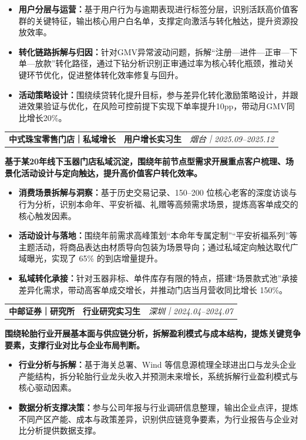 \documentclass[10pt, a4paper]{article}
\makeatletter
\newcommand{\resumeEntry}[4]{
  \vspace{3.5pt}
  \noindent
  {\normalsize
  \begin{tabular*}{\textwidth}{@{}p{0.33\textwidth}@{\extracolsep{\fill}}>{\centering\arraybackslash}p{0.34\textwidth}>{\raggedleft\arraybackslash}p{0.33\textwidth}@{}}
    \textbf{#1} & \textbf{#3} & {\small\textit{#2｜#4}}
  \end{tabular*}\par}
  \vspace{1pt}
}
\newcommand{\resumeDesc}[1]{
  \vspace{-1pt}
  {\footnotesize\noindent\textbf{#1}\par}
  \vspace{2pt}
}
\makeatother
\begin{document}
\begin{itemize}
    \item \textbf{用户分层与运营：}基于用户行为与逾期表现进行标签分层，识别活跃高价值客群的关键特征，输出核心用户白名单，支撑定向激活与转化触达，提升资源投放效率。
    \item \textbf{转化链路拆解与归因：}针对GMV异常波动问题，拆解“注册—进件—正审—下单—放款”转化路径，通过下钻分析识别正审通过率为核心转化瓶颈，推动关键环节优化，促进整体转化效率修复与回升。
    \item \textbf{活动策略设计：}围绕续贷转化提升目标，参与差异化转化激励策略设计，并跟进效果验证与优化，在风险可控前提下实现下单率提升10pp，带动月GMV同比增长20\%。
\end{itemize}

\resumeEntry{中式珠宝零售门店｜私域增长}{烟台}{用户增长实习生}{2025.09--2025.12}
\resumeDesc{基于某20年线下玉器门店私域沉淀，围绕年前节点型需求开展重点客户梳理、场景化活动设计与定向触达，提升高价值客户转化效率。}

\begin{itemize}
    \item \textbf{消费场景拆解与洞察：}基于历史交易记录、150--200 位核心老客的深度访谈与行为分析，识别本命年、平安祈福、礼赠等高频需求场景，提炼高客单成交的核心触发因素。
    \item \textbf{活动设计与落地：}围绕年前需求高峰策划“本命年专属定制”“平安祈福系列”等主题活动，将商品表达由材质导向包装为场景导向；通过私域定向触达取代广域曝光，实现了 65\% 的到店增量提升。
    \item \textbf{私域转化承接：}针对玉器非标、单件库存有限的特点，搭建“场景款式池”承接差异化需求，带动高客单成交增长，并推动门店当月营收同比增长 150\%。
\end{itemize}

\resumeEntry{中邮证券｜研究所}{深圳}{行业研究实习生}{2024.04--2024.07}
\resumeDesc{围绕轮胎行业开展基本面与供应链分析，拆解盈利模式与成本结构，提炼关键竞争要素，支撑行业对比与企业布局判断。}

\begin{itemize}
    \item \textbf{行业分析与拆解：}基于海关总署、Wind 等信息源梳理全球进出口与龙头企业产能结构，拆分轮胎行业龙头收入并预测未来增长，系统拆解行业盈利模式与核心驱动因素。
    \item \textbf{数据分析支撑决策：}参与公司年报与行业调研信息整理，输出企业点评，提炼不同产区产能、成本与政策差异，识别供应链竞争要素，为行业报告与企业对比分析提供数据支撑。
\end{itemize}
\end{document}
